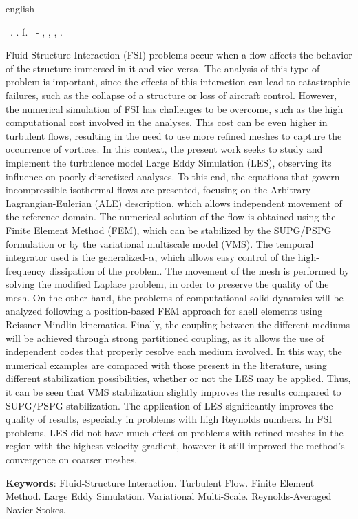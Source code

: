 \begin{resumo}[Abstract]
    \begin{otherlanguage*}{english}
        \begin{flushleft}
            \setlength{\absparsep}{0pt} %
            \SingleSpacing
            \Autorabr\ \textbf{\Title}.	\the\year. \pageref{LastPage}f.
            \Typeofwork\ - \Unidademin, \Universidade, \Local, \the\year.
        \end{flushleft}
        \OnehalfSpacing

        Fluid-Structure Interaction (FSI) problems occur when a flow affects the behavior of the structure immersed in it and vice versa. The analysis of this type of problem is important, since the effects of this interaction can lead to catastrophic failures, such as the collapse of a structure or loss of aircraft control. However, the numerical simulation of FSI has challenges to be overcome, such as the high computational cost involved in the analyses. This cost can be even higher in turbulent flows, resulting in the need to use more refined meshes to capture the occurrence of vortices. In this context, the present work seeks to study and implement the turbulence model Large Eddy Simulation (LES), observing its influence on poorly discretized analyses. To this end, the equations that govern incompressible isothermal flows are presented, focusing on the Arbitrary Lagrangian-Eulerian (ALE) description, which allows independent movement of the reference domain. The numerical solution of the flow is obtained using the Finite Element Method (FEM), which can be stabilized by the SUPG/PSPG formulation or by the variational multiscale model (VMS). The temporal integrator used is the generalized-$\alpha$, which allows easy control of the high-frequency dissipation of the problem. The movement of the mesh is performed by solving the modified Laplace problem, in order to preserve the quality of the mesh. On the other hand, the problems of computational solid dynamics will be analyzed following a position-based FEM approach for shell elements using Reissner-Mindlin kinematics. Finally, the coupling between the different mediums will be achieved through strong partitioned coupling, as it allows the use of independent codes that properly resolve each medium involved. In this way, the numerical examples are compared with those present in the literature, using different stabilization possibilities, whether or not the LES may be applied. Thus, it can be seen that VMS stabilization slightly improves the results compared to SUPG/PSPG stabilization. The application of LES significantly improves the quality of results, especially in problems with high Reynolds numbers. In FSI problems, LES did not have much effect on problems with refined meshes in the region with the highest velocity gradient, however it still improved the method's convergence on coarser meshes.

        \textbf{Keywords}: Fluid-Structure Interaction. Turbulent Flow. Finite Element Method. Large Eddy Simulation. Variational Multi-Scale. Reynolds-Averaged Navier-Stokes.
    \end{otherlanguage*}
\end{resumo}